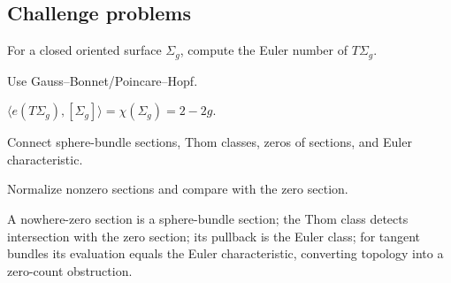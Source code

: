 \subsection*{Challenge problems}

\begin{exercise}\label{exr:viii32-ped-15}
For a closed oriented surface $\Sigma_g$, compute the Euler number of $T\Sigma_g$.
\end{exercise}
\begin{hint}
Use Gauss--Bonnet/Poincare--Hopf.
\end{hint}
\begin{solution}
$\langle e(T\Sigma_g),[\Sigma_g]\rangle=\chi(\Sigma_g)=2-2g$.
\end{solution}

\begin{exercise}\label{exr:viii32-ped-16}
Connect sphere-bundle sections, Thom classes, zeros of sections, and Euler characteristic.
\end{exercise}
\begin{hint}
Normalize nonzero sections and compare with the zero section.
\end{hint}
\begin{solution}
A nowhere-zero section is a sphere-bundle section; the Thom class detects intersection with the zero section; its pullback is the Euler class; for tangent bundles its evaluation equals the Euler characteristic, converting topology into a zero-count obstruction.
\end{solution}

